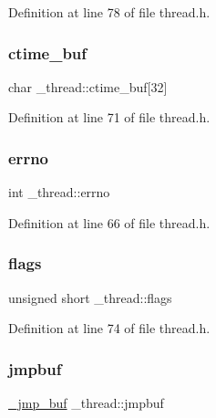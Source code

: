 Definition at line 78 of file thread.\+h.

\mbox{\label{struct__thread_a9e69f2ea7a1a889bea1c05105d9f2354}} 
\subsubsection{\texorpdfstring{ctime\_buf}{ctime\_buf}}
{\footnotesize\ttfamily char \+\_\+thread\+::ctime\+\_\+buf\mbox{[}32\mbox{]}}



Definition at line 71 of file thread.\+h.

\mbox{\label{struct__thread_afd1d4c8cdaccd36ad60cde7d96c435eb}} 
\subsubsection{\texorpdfstring{errno}{errno}}
{\footnotesize\ttfamily int \+\_\+thread\+::errno}



Definition at line 66 of file thread.\+h.

\mbox{\label{struct__thread_ade2246148b4c3de39d7c867f10addb39}} 
\subsubsection{\texorpdfstring{flags}{flags}}
{\footnotesize\ttfamily unsigned short \+\_\+thread\+::flags}



Definition at line 74 of file thread.\+h.

\mbox{\label{struct__thread_a7e89c67c1bb923396cb5d7a76afb4091}} 
\subsubsection{\texorpdfstring{jmpbuf}{jmpbuf}}
{\footnotesize\ttfamily \mbox{\hyperlink{jmpbuf_8h_a39955153a4f32ebff06ff99d7ee9a05e}{\+\_\+jmp\+\_\+buf}} \+\_\+thread\+::jmpbuf}



